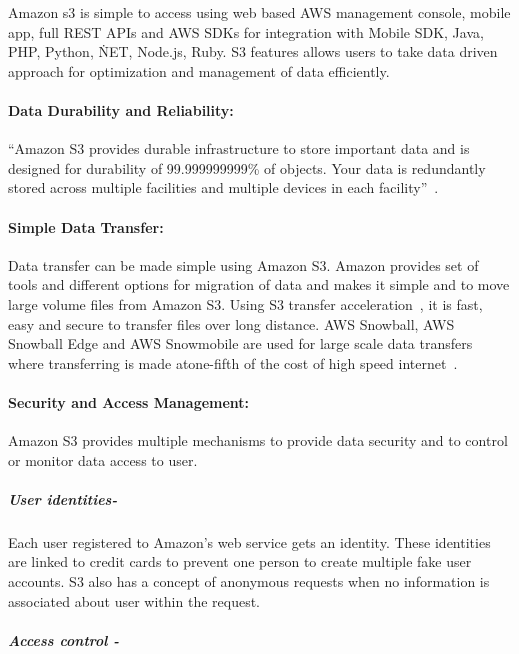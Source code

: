 Amazon s3 is simple to access using web based AWS management console, mobile
app, full REST APIs and AWS SDKs for integration with Mobile SDK, Java, PHP,
Python, \.NET,
Node.js, Ruby. S3 features allows users to take data driven
approach for optimization and management of data efficiently.



\paragraph{Data Durability and Reliability:} 

``Amazon S3 provides durable infrastructure to store important data and is
designed for durability of 99.999999999\% of objects. Your data is redundantly
stored across multiple facilities and multiple devices in each
facility''~\cite{hid-sp18-420-amazon-S3}.

\paragraph{Simple Data Transfer:} 

Data transfer can be made simple using Amazon S3. Amazon provides set of tools
and different options for migration of data and makes it simple and to move
large volume files from Amazon S3. Using S3 transfer
acceleration~\cite{hid-sp18-420-amazon-S3-dataTransfer-FAQ}, it is fast, easy
and secure to
transfer files over long distance. AWS Snowball, AWS Snowball Edge and AWS
Snowmobile are used for large scale data transfers where transferring is made
atone-fifth of the cost of high speed
internet~\cite{hid-sp18-420-amazon-S3-cloud-migration}.

\paragraph{Security and Access Management:} 

Amazon S3 provides multiple mechanisms to provide data security and to control
or monitor data access to user.

\subparagraph{User identities-}

Each user registered to Amazon’s web service gets an identity. These identities
are linked to credit cards to prevent one person to create multiple fake user
accounts. S3 also has a concept of anonymous requests when no information is
associated about user within the request.

\subparagraph{Access control -}

